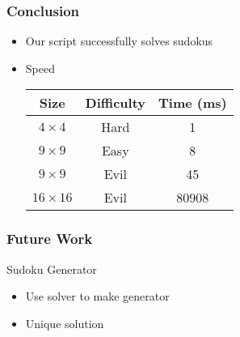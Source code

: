 \documentclass{beamer}
\begin{document}
\begin{frame}
  \frametitle{Conclusion}
  \begin{itemize}
  \item Our script successfully solves sudokus 
  \item Speed
\begin{table}[]
\centering
\label{my-label}
\begin{tabular}{c|c|c}
\textbf{Size }        &\textbf{ Difficulty }& \textbf{Time (ms)} \\ \hline
$4 \times 4$ & Hard       & 1         \\ \hline
$9 \times 9$ & Easy       & 8         \\ \hline
$9 \times 9$ & Evil       & 45        \\ \hline
$16 \times 16$ & Evil     & 80908     \\ 
\end{tabular}
\end{table}
  \end{itemize}
\end{frame}

\begin{frame}
  \frametitle{Future Work}
  \begin{block}{Sudoku Generator}
    \begin{itemize}
    \item Use solver to make generator 
    \item Unique solution
    \end{itemize}
  \end{block}
\end{frame}
\end{document}
